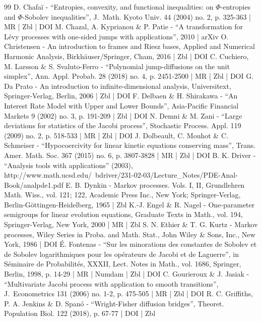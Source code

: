 \documentclass[10pt]{amsart}
\theoremstyle{plain}
\theoremstyle{definition}
\begin{document}
\begin{thebibliography}{99}
D. Chafaï - “Entropies, convexity, and functional inequalities: on $\Phi $-entropies and $\Phi $-Sobolev inequalities”, J. Math. Kyoto Univ. 44 (2004) no. 2, p. 325-363 | MR | Zbl | DOI
M. Chazal, A. Kyprianou \& P. Patie - “A transformation for Lévy processes with one-sided jumps with applications”, 2010 | arXiv
O. Christensen - An introduction to frames and Riesz bases, Applied and Numerical Harmonic Analysis, Birkhäuser/Springer, Cham, 2016 | Zbl | DOI
C. Cuchiero, M. Larsson \& S. Svaluto-Ferro - “Polynomial jump-diffusions on the unit simplex”, Ann. Appl. Probab. 28 (2018) no. 4, p. 2451-2500 | MR | Zbl | DOI
G. Da Prato - An introduction to infinite-dimensional analysis, Universitext, Springer-Verlag, Berlin, 2006 | Zbl | DOI
F. Delbaen \& H. Shirakawa - “An Interest Rate Model with Upper and Lower Bounds”, Asia-Pacific Financial Markets 9 (2002) no. 3, p. 191-209 | Zbl | DOI
N. Demni \& M. Zani - “Large deviations for statistics of the Jacobi process”, Stochastic Process. Appl. 119 (2009) no. 2, p. 518-533 | MR | Zbl | DOI
J. Dolbeault, C. Mouhot \& C. Schmeiser - “Hypocoercivity for linear kinetic equations conserving mass”, Trans. Amer. Math. Soc. 367 (2015) no. 6, p. 3807-3828 | MR | Zbl | DOI
B. K. Driver - “Analysis tools with applications” (2003), http://www.math.ucsd.edu/~bdriver/231-02-03/Lecture\_Notes/PDE-Anal-Book/analpde1.pdf
E. B. Dynkin - Markov processes. Vols. I, II, Grundlehren Math. Wiss., vol. 121; 122, Academic Press Inc., New York; Springer-Verlag, Berlin-Göttingen-Heidelberg, 1965 | Zbl
K.-J. Engel \& R. Nagel - One-parameter semigroups for linear evolution equations, Graduate Texts in Math., vol. 194, Springer-Verlag, New York, 2000 | MR | Zbl
S. N. Ethier \& T. G. Kurtz - Markov processes, Wiley Series in Proba. and Math. Stat., John Wiley \& Sons, Inc., New York, 1986 | DOI
É. Fontenas - “Sur les minorations des constantes de Sobolev et de Sobolev logarithmiques pour les opérateurs de Jacobi et de Laguerre”, in Séminaire de Probabilités, XXXII, Lect. Notes in Math., vol. 1686, Springer, Berlin, 1998, p. 14-29 | MR | Numdam | Zbl | DOI
C. Gourieroux \& J. Jasiak - “Multivariate Jacobi process with application to smooth transitions”, J. Econometrics 131 (2006) no. 1-2, p. 475-505 | MR | Zbl | DOI
R. C. Griffiths, P. A. Jenkins \& D. Spanó - “Wright-Fisher diffusion bridges”, Theoret. Population Biol. 122 (2018), p. 67-77 | DOI | Zbl

\end{thebibliography}
\end{document}
